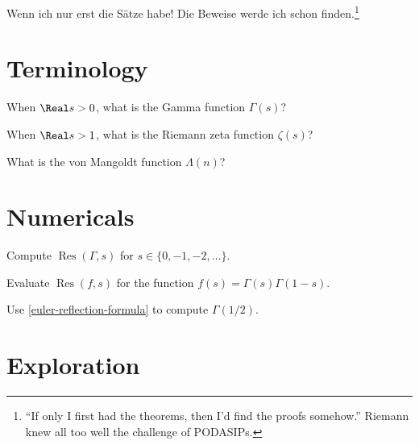 \documentclass{homework}
\author{Jim Fowler}
\DeclareMathOperator{\Res}{Res}
\begin{document}
\maketitle

\begin{inspiration}
  Wenn ich nur erst die S\"atze habe! Die Beweise werde ich schon
  finden.\footnote{``If only I first had the theorems, then I'd find
    the proofs somehow.''  Riemann knew all too well the challenge of
    PODASIPs.} 
\end{inspiration}

\section{Terminology}

\begin{problem}
  When $\Real s > 0$, what is the Gamma function $\Gamma(s)$?
\end{problem}

\begin{problem}
  When $\Real s > 1$, what is the Riemann zeta function $\zeta(s)$?
\end{problem}

\begin{problem}
  What is the von Mangoldt function $\Lambda(n)$?
\end{problem}

\section{Numericals}

\begin{problem}
  Compute $\Res(\Gamma,s)$ for $s \in \{ 0, -1, -2, \ldots \}$.
\end{problem}

\begin{problem}Evaluate $\Res(f,s)$ for the
  function $f(s) = \Gamma(s) \Gamma(1-s)$.
\end{problem}

\begin{problem} %
  Use \ref{euler-reflection-formula} to compute $\Gamma(1/2)$.  
\end{problem}

\section{Exploration}
\end{document}
